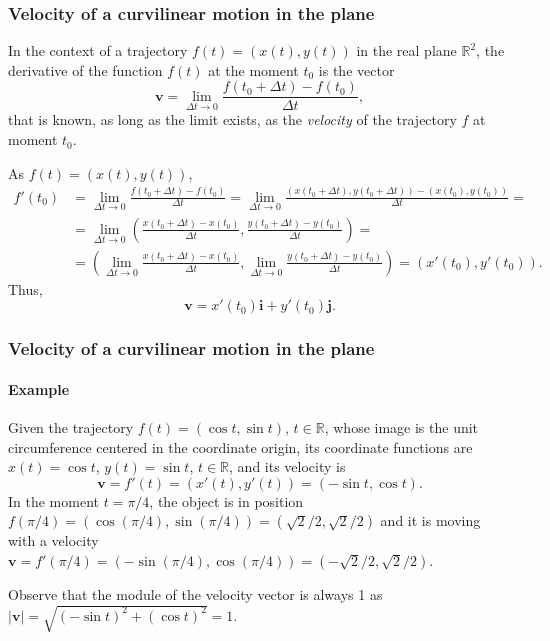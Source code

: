 \begin{frame}
\frametitle{Velocity of a curvilinear motion in the plane}
In the context of a trajectory $f(t)=(x(t),y(t))$ in the real plane $\mathbb{R}^2$, the derivative of the function $f(t)$ at the moment $t_0$ is the vector
\[
\mathbf{v} = \lim_{\Delta t\rightarrow 0} \frac{f(t_0+\Delta t)-f(t_0)}{\Delta t},
\]
that is known, as long as the limit exists, as the \emph{velocity} of the trajectory $f$ at moment $t_0$.

As $f(t)=(x(t),y(t))$,
\begin{align*}
f'(t_0)&=\lim_{\Delta t\rightarrow 0} \frac{f(t_0+\Delta t)-f(t_0)}{\Delta t} = \lim_{\Delta t\rightarrow 0} \frac{(x(t_0+\Delta t),y(t_0+\Delta t))-(x(t_0),y(t_0))}{\Delta t} =\\
&=  \lim_{\Delta t\rightarrow 0} \left(\frac{x(t_0+\Delta t)-x(t_0)}{\Delta t},\frac{y(t_0+\Delta t)-y(t_0)}{\Delta t}\right) =\\
&= \left(\lim_{\Delta t\rightarrow 0}\frac{x(t_0+\Delta t)-x(t_0)}{\Delta t},\lim_{\Delta t\rightarrow 0}\frac{y(t_0+\Delta t)-y(t_0)}{\Delta t}\right) = (x'(t_0),y'(t_0)).
\end{align*}
Thus, 
\[
\mathbf{v} = x'(t_0)\mathbf{i}+y'(t_0)\mathbf{j}.
\]
\end{frame}


\begin{frame}
\frametitle{Velocity of a curvilinear motion in the plane}
\framesubtitle{Example}
Given the trajectory $f(t) = (\cos t,\sin t)$, $t\in \mathbb{R}$, whose image is the unit circumference centered in the coordinate origin, its coordinate functions are $x(t) = \cos t$, $y(t) = \sin t$, $t\in \mathbb{R}$, and its velocity is
\[
\mathbf{v}=f'(t)=(x'(t),y'(t))=(-\sin t, \cos t).
\]
In the moment $t=\pi/4$, the object is in position $f(\pi/4) = (\cos(\pi/4),\sin(\pi/4)) =(\sqrt{2}/2,\sqrt{2}/2)$
and it is moving with a velocity $\mathbf{v}=f'(\pi/4)=(-\sin(\pi/4),\cos(\pi/4))=(-\sqrt{2}/2,\sqrt{2}/2)$.
\begin{center}
\end{center}
Observe that the module of the velocity vector is always 1 as
$|\mathbf{v}|=\sqrt{(-\sin t)^2+(\cos t)^2}=1$.
\end{frame}



